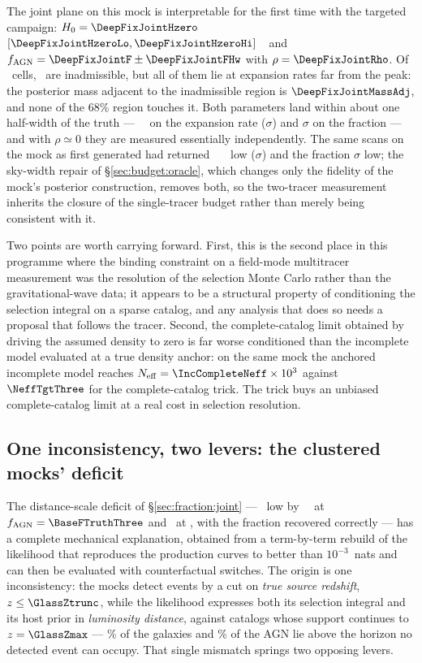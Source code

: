 The joint plane on this mock is interpretable for the first time with the
targeted campaign: $\Hz = \DeepFixJointHzero$ $[\DeepFixJointHzeroLo,
\DeepFixJointHzeroHi]$~\kmsmpc\ and $\fagn = \DeepFixJointF \pm
\DeepFixJointFHw$ with $\rho = \DeepFixJointRho$. Of \DeepJointCells\ cells,
\DeepFixJointRej\ are inadmissible, but all of them lie at expansion rates
far from the peak: the posterior mass adjacent to the inadmissible region is
$\DeepFixJointMassAdj$, and none of the 68\% region touches it. Both
parameters land within about one half-width of the truth ---
\DeepFixJointHzeroOff~\kmsmpc\ on the expansion rate
(\DeepFixJointHzeroSig$\sigma$) and \DeepFixJointFSig$\sigma$ on the fraction
--- and with $\rho \simeq 0$ they are measured essentially independently. The
same scans on the mock as first generated had returned \Hz\
\DeepJointHzeroOffAbs~\kmsmpc\ low (\DeepJointHzeroSig$\sigma$) and the
fraction \DeepFTgtSig$\sigma$ low; the sky-width repair of
\S\ref{sec:budget:oracle}, which changes only the fidelity of the mock's
posterior construction, removes both, so the two-tracer measurement inherits
the closure of the single-tracer budget rather than merely being consistent
with it.

Two points are worth carrying forward. First, this is the second place in this
programme where the binding constraint on a field-mode multitracer measurement
was the resolution of the selection Monte Carlo rather than the
gravitational-wave data; it appears to be a structural property of conditioning
the selection integral on a sparse catalog, and any analysis that does so needs
a proposal that follows the tracer. Second, the complete-catalog limit obtained
by driving the assumed density to zero is far worse conditioned than the
incomplete model evaluated at a true density anchor: on the same mock the
anchored incomplete model reaches $\Neff = \IncCompleteNeff \times 10^3$ against
$\NeffTgtThree$ for the complete-catalog trick. The trick buys an unbiased
complete-catalog limit at a real cost in selection resolution.

\subsection{One inconsistency, two levers: the clustered mocks' deficit}
\label{sec:selection:tilt}

The distance-scale deficit of \S\ref{sec:fraction:joint} --- \Hz\ low by
\BaseJointHzeroOffAbsThree~\kmsmpc\ at $\fagn = \BaseFTruthThree$ and
\BaseJointHzeroOffAbsSeven\ at \BaseFTruthSeven, with the fraction recovered
correctly --- has a complete mechanical explanation, obtained from a
term-by-term rebuild of the likelihood that reproduces the production curves to
better than $10^{-3}$~nats and can then be evaluated with counterfactual
switches. The origin is one inconsistency: the mocks detect events by a cut on
\emph{true source redshift}, $z \le \GlassZtrunc$, while the likelihood
expresses both its selection integral and its host prior in \emph{luminosity
distance}, against catalogs whose support continues to $z = \GlassZmax$ ---
\TiltCatAboveGal\% of the galaxies and \TiltCatAboveAgn\% of the AGN lie above
the horizon no detected event can occupy. That single mismatch springs two
opposing levers.

